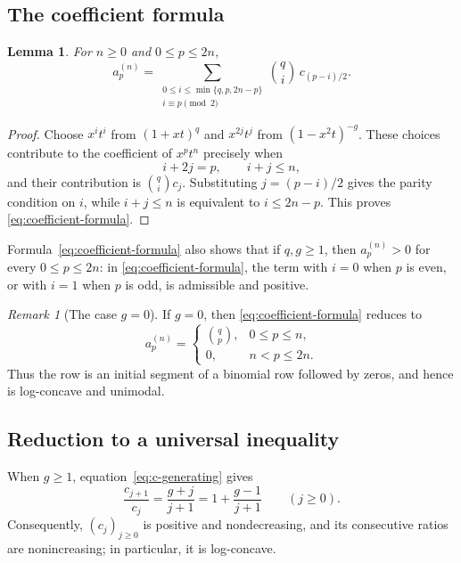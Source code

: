 \documentclass[12pt]{amsart}
\theoremstyle{plain}
\newtheorem{lemma}[theorem]{Lemma}
\theoremstyle{definition}
\theoremstyle{remark}
\newtheorem{remark}[theorem]{Remark}
\begin{document}
\subsection{The coefficient formula}

\begin{lemma}\label{lem:coefficient-formula}
For \(n\ge0\) and \(0\le p\le2n\),
\begin{equation}\label{eq:coefficient-formula}
 a_p^{(n)}=
 \sum_{\substack{0\le i\le\min\{q,p,2n-p\}\\
                   i\equiv p\pmod2}}
 \binom qi\,c_{(p-i)/2}.
\end{equation}
\end{lemma}

\begin{proof}
Choose \(x^it^i\) from \((1+xt)^q\) and \(x^{2j}t^j\) from
\((1-x^2t)^{-g}\).  These choices contribute to the coefficient of
\(x^pt^n\) precisely when
\[
 i+2j=p,
 \qquad
 i+j\le n,
\]
and their contribution is \(\binom qi c_j\).  Substituting
\(j=(p-i)/2\) gives the parity condition on \(i\), while \(i+j\le n\)
is equivalent to \(i\le2n-p\).  This proves
\eqref{eq:coefficient-formula}.
\end{proof}

Formula~\eqref{eq:coefficient-formula} also shows that if \(q,g\ge1\), then
\(a_p^{(n)}>0\) for every \(0\le p\le2n\): in
\eqref{eq:coefficient-formula}, the term with \(i=0\) when \(p\) is even,
or with \(i=1\) when \(p\) is odd, is admissible and positive.

\begin{remark}[The case \(g=0\)]\label{rem:g-zero}
If \(g=0\), then \eqref{eq:coefficient-formula} reduces to
\[
 a_p^{(n)}=
 \begin{cases}
  \binom qp,&0\le p\le n,\\
  0,&n<p\le2n.
 \end{cases}
\]
Thus the row is an initial segment of a binomial row followed by zeros,
and hence is log-concave and unimodal.
\end{remark}

\subsection{Reduction to a universal inequality}

When \(g\ge1\), equation~\eqref{eq:c-generating} gives
\begin{equation}\label{eq:c-ratio}
 \frac{c_{j+1}}{c_j}
 =\frac{g+j}{j+1}
 =1+\frac{g-1}{j+1}
 \qquad(j\ge0).
\end{equation}
Consequently, \((c_j)_{j\ge0}\) is positive and nondecreasing, and its
consecutive ratios are nonincreasing; in particular, it is log-concave.
\end{document}
